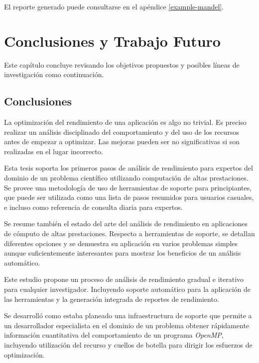 \documentclass[a4paper]{report}
\begin{document}
\bigskip

El reporte generado puede consultarse en el apéndice \ref{example-mandel}.

\chapter{Conclusiones y Trabajo Futuro} \label{Conclusiones y Trabajo Futuro}

Este capítulo concluye revisando los objetivos propuestos y posibles líneas de investigación como continuación.

\section{Conclusiones}

La optimización del rendimiento de una aplicación es algo no trivial.
Es preciso realizar un análisis disciplinado del comportamiento y del uso de los recursos antes de
empezar a optimizar. Las mejoras pueden ser no significativas si son realizadas en el lugar incorrecto.

\bigskip

Esta tesis soporta los primeros pasos de análisis de rendimiento para expertos del dominio de un problema científico utilizando computación de altas prestaciones. Se provee una metodología de uso de herramientas de soporte para principiantes, que puede ser utilizada como una lista de pasos resumidos para usuarios casuales, e incluso como referencia de consulta diaria para expertos.

\bigskip

Se resume también el estado del arte del análisis de rendimiento en aplicaciones de cómputo de altas prestaciones. Respecto a herramientas de soporte, se detallan diferentes opciones y se demuestra su aplicación en varios problemas simples aunque suficientemente interesantes para mostrar los beneficios de un análisis automático. 

\bigskip

Este estudio propone un proceso de análisis de rendimiento gradual e iterativo para cualquier investigador. 
Incluyendo soporte automático para la aplicación de las herramientas y la generación integrada de
reportes de rendimiento.

\bigskip

Se desarrolló como estaba planeado una infraestructura de soporte que permite a un desarrollador especialista en el dominio de un problema obtener rápidamente información cuantitativa del comportamiento de un programa {\it OpenMP}, incluyendo utilización del recurso y cuellos de botella para dirigir los esfuerzos de optimización.
\end{document}
